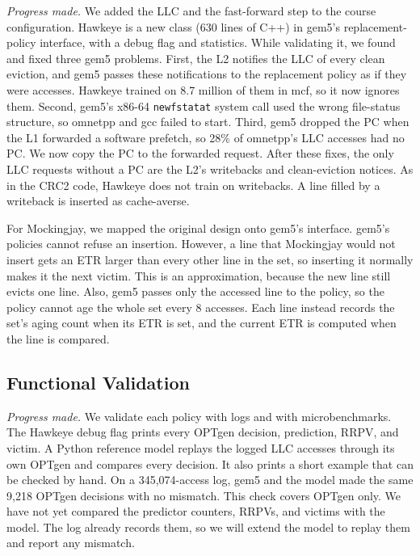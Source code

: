 \documentclass[10pt,journal,compsoc]{IEEEtran}
\begin{document}
\emph{Progress made.} We added the LLC and the fast-forward step to the course
configuration. Hawkeye is a new class (630 lines of C++) in gem5's
replacement-policy interface, with a debug flag and statistics. While
validating it, we found and fixed three gem5 problems. First, the L2 notifies the LLC of every clean eviction, and gem5 passes
these notifications to the replacement policy as if they were accesses. Hawkeye
trained on 8.7 million of them in mcf, so it now ignores them. Second, gem5's
x86-64 \texttt{newfstatat} system call used the wrong file-status structure, so
omnetpp and gcc failed to start. Third, gem5 dropped the PC when the L1
forwarded a software prefetch, so 28\% of omnetpp's LLC accesses had no PC.
We now copy the PC to the forwarded request. After these fixes, the only LLC
requests without a PC are the L2's writebacks and clean-eviction notices. As in
the CRC2 code, Hawkeye does not train on writebacks. A line filled by a
writeback is inserted as cache-averse.

For Mockingjay, we mapped the original design onto gem5's interface. gem5's
policies cannot refuse an insertion. However, a line that Mockingjay would not
insert gets an ETR larger than every other line in the set, so inserting it
normally makes it the next victim. This is an approximation, because the new
line still evicts one line. Also, gem5 passes only the accessed line to
the policy, so the policy cannot age the whole set every 8 accesses. Each line
instead records the set's aging count when its ETR is set, and the current ETR
is computed when the line is compared.

\subsection{Functional Validation}

\emph{Progress made.} We validate each policy with logs and with
microbenchmarks. The Hawkeye debug flag prints every OPTgen decision,
prediction, RRPV, and victim. A Python reference model replays the logged LLC
accesses through its own OPTgen and compares every decision. It also prints a
short example that can be checked by hand. On a 345,074-access log, gem5 and the
model made the same 9,218 OPTgen decisions with no mismatch. This check covers
OPTgen only. We have not yet compared the predictor counters, RRPVs, and
victims with the model. The log already records them, so we will extend the
model to replay them and report any mismatch.
\end{document}
